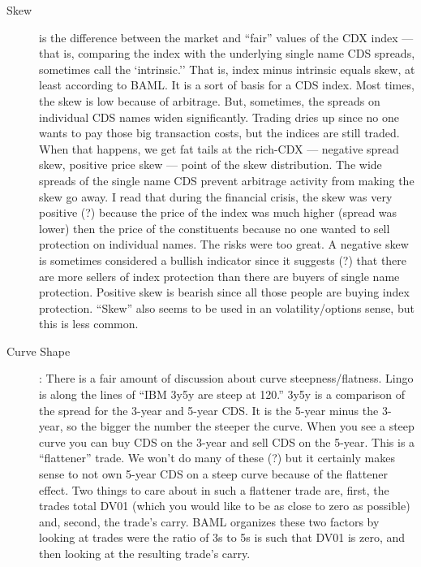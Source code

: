 \documentclass[12pt]{article}
\begin{document}
\begin{description}
  \item[Skew] is the difference between the market and ``fair'' values of the CDX index --- that is, comparing the index with the underlying single name CDS spreads, sometimes call the `intrinsic.'' That is, index minus intrinsic equals skew, at least according to BAML. It is a sort of basis for a CDS index. Most times, the skew is low because of arbitrage. But, sometimes, the spreads on individual CDS names widen significantly. Trading dries up since no one wants to pay those big transaction costs, but the indices are still traded. When that happens, we get fat tails at the rich-CDX --- negative spread skew, positive price skew --- point of the skew distribution. The wide spreads of the single name CDS prevent arbitrage activity from making the skew go away. I read that during the financial crisis, the skew was very positive (?) because the price of the index was much higher (spread was lower) then the price of the constituents because no one wanted to sell protection on individual names. The risks were too great. A negative skew is sometimes considered a bullish indicator since it suggests (?) that there are more sellers of index protection than there are buyers of single name protection. Positive skew is bearish since all those people are buying index protection. ``Skew'' also seems to be used in an volatility/options sense, but this is less common. 

  \item[Curve Shape]: There is a fair amount of discussion about curve steepness/flatness. Lingo is along the lines of ``IBM 3y5y are steep at 120.'' 3y5y is a comparison of the spread for the 3-year and 5-year CDS. It is the 5-year minus the 3-year, so the bigger the number the steeper the curve. When you see a steep curve you can buy CDS on the 3-year and sell CDS on the 5-year. This is a ``flattener'' trade. We won't do many of these (?) but it certainly makes sense to not own 5-year CDS on a steep curve because of the flattener effect. Two things to care about in such a flattener trade are, first, the trades total DV01 (which you would like to be as close to zero as possible) and, second, the trade's carry. BAML organizes these two factors by looking at trades were the ratio of 3s to 5s is such that DV01 is zero, and then looking at the resulting trade's carry.



\end{description}
\end{document}
